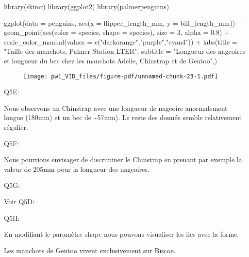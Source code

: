 \documentclass[
  letterpaper,
  DIV=11,
  numbers=noendperiod]{scrartcl}
\newenvironment{Shaded}{}{}
\newcommand{\AttributeTok}[1]{\textcolor[rgb]{0.84,0.23,0.29}{#1}}
\newcommand{\DecValTok}[1]{\textcolor[rgb]{0.00,0.36,0.77}{#1}}
\newcommand{\FloatTok}[1]{\textcolor[rgb]{0.00,0.36,0.77}{#1}}
\newcommand{\FunctionTok}[1]{\textcolor[rgb]{0.44,0.26,0.76}{#1}}
\newcommand{\NormalTok}[1]{\textcolor[rgb]{0.14,0.16,0.18}{#1}}
\newcommand{\SpecialCharTok}[1]{\textcolor[rgb]{0.00,0.36,0.77}{#1}}
\newcommand{\StringTok}[1]{\textcolor[rgb]{0.01,0.18,0.38}{#1}}
\begin{document}
\begin{Shaded}
\begin{Highlighting}[]
\FunctionTok{library}\NormalTok{(skimr)}
\FunctionTok{library}\NormalTok{(ggplot2)}
\FunctionTok{library}\NormalTok{(palmerpenguins)}

\FunctionTok{ggplot}\NormalTok{(}\AttributeTok{data =}\NormalTok{ penguins, }\FunctionTok{aes}\NormalTok{(}\AttributeTok{x =}\NormalTok{ flipper\_length\_mm, }\AttributeTok{y =}\NormalTok{ bill\_length\_mm)) }\SpecialCharTok{+}
  \FunctionTok{geom\_point}\NormalTok{(}\FunctionTok{aes}\NormalTok{(}\AttributeTok{color =}\NormalTok{ species, }\AttributeTok{shape =}\NormalTok{ species), }\AttributeTok{size =} \DecValTok{3}\NormalTok{, }\AttributeTok{alpha =} \FloatTok{0.8}\NormalTok{) }\SpecialCharTok{+}
  \FunctionTok{scale\_color\_manual}\NormalTok{(}\AttributeTok{values =} \FunctionTok{c}\NormalTok{(}\StringTok{"darkorange"}\NormalTok{,}\StringTok{"purple"}\NormalTok{,}\StringTok{"cyan4"}\NormalTok{)) }\SpecialCharTok{+}
  \FunctionTok{labs}\NormalTok{(}\AttributeTok{title =} \StringTok{"Taille des manchots, Palmer Station LTER"}\NormalTok{,}
  \AttributeTok{subtitle =} \StringTok{"Longueur des nageoires et longueur du bec chez les manchots Adelie,    Chinstrap et de Gentoo"}\NormalTok{,)}
\end{Highlighting}
\end{Shaded}

\begin{figure}[H]

{\centering \texttt{[image: pw1\_VID\_files/figure-pdf/unnamed-chunk-23-1.pdf]}

}

\end{figure}

Q5E:

Nous observons un Chinstrap avec une longueur de nageoire anormalement
longue (180mm) et un bec de \textasciitilde57mm). Le reste des donnée
semble relativement régulier.

Q5F:

Nous pourrions envisager de discriminer le Chinstrap en prenant par
exemple la valeur de 205mm pour la longueur des nageoires.

Q5G:

Voir Q5D:

Q5H:

En modifiant le paramètre shape nous pouvons visualiser les iles avec la
forme.

Les manchots de Gentoo vivent exclusivement sur Biscoe.
\end{document}
